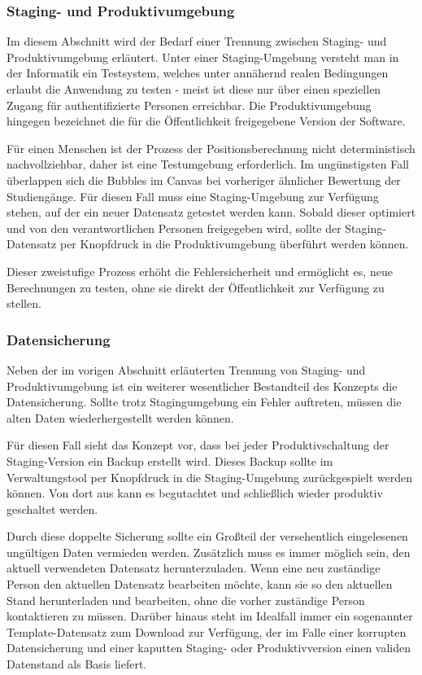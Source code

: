 \subsubsection{Staging- und Produktivumgebung}
Im diesem Abschnitt wird der Bedarf einer Trennung zwischen Staging- und Produktivumgebung erläutert. Unter einer Staging-Umgebung versteht man in der Informatik ein Testsystem, welches unter annähernd realen Bedingungen erlaubt die Anwendung zu testen - meist ist diese nur über einen speziellen Zugang für authentifizierte Personen erreichbar. Die Produktivumgebung hingegen bezeichnet die für die Öffentlichkeit freigegebene Version der Software.

Für einen Menschen ist der Prozess der Positionsberechnung nicht deterministisch nachvollziehbar, daher ist eine Testumgebung erforderlich. Im ungünstigsten Fall überlappen sich die Bubbles im Canvas bei vorheriger ähnlicher Bewertung der Studiengänge. Für diesen Fall muss eine Staging-Umgebung zur Verfügung stehen, auf der ein neuer Datensatz getestet werden kann. Sobald dieser optimiert und von den verantwortlichen Personen freigegeben wird, sollte der Staging-Datensatz per Knopfdruck in die Produktivumgebung überführt werden können.

Dieser zweistufige Prozess erhöht die Fehlersicherheit und ermöglicht es, neue Berechnungen zu testen, ohne sie direkt der Öffentlichkeit zur Verfügung zu stellen.

\subsubsection{Datensicherung}
Neben der im vorigen Abschnitt erläuterten Trennung von Staging- und Produktivumgebung ist ein weiterer wesentlicher Bestandteil des Konzepts die Datensicherung. Sollte trotz Stagingumgebung ein Fehler auftreten, müssen die alten Daten wiederhergestellt werden können.

Für diesen Fall sieht das Konzept vor, dass bei jeder Produktivschaltung der Staging-Version ein Backup erstellt wird. Dieses Backup sollte im Verwaltungstool per Knopfdruck in die Staging-Umgebung zurückgespielt werden können. Von dort aus kann es begutachtet und schließlich wieder produktiv geschaltet werden.

Durch diese doppelte Sicherung sollte ein Großteil der versehentlich eingelesenen ungültigen Daten vermieden werden. Zusätzlich muss es immer möglich sein, den aktuell verwendeten Datensatz herunterzuladen. Wenn eine neu zuständige Person den aktuellen Datensatz bearbeiten möchte, kann sie so den aktuellen Stand herunterladen und bearbeiten, ohne die vorher zuständige Person kontaktieren zu müssen. Darüber hinaus steht im Idealfall immer ein sogenannter Template-Datensatz zum Download zur Verfügung, der im Falle einer korrupten Datensicherung und einer kaputten Staging- oder Produktivversion einen validen Datenstand als Basis liefert.